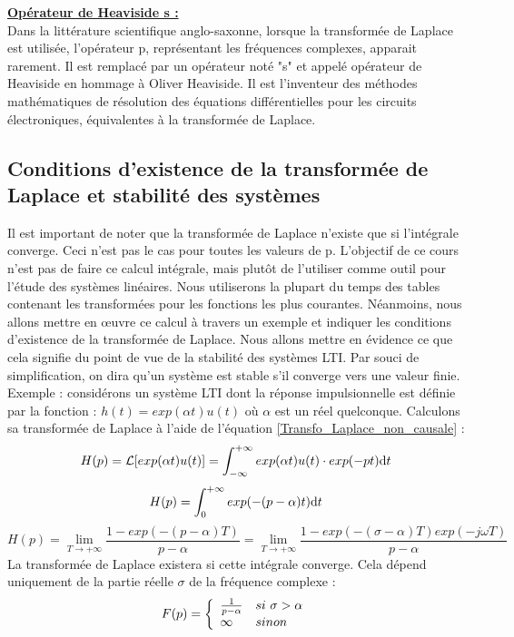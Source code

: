 	\underline{\textbf{Opérateur de Heaviside s :}}\\
	Dans la littérature scientifique anglo-saxonne, lorsque la transformée de Laplace est utilisée, l'opérateur p, représentant les fréquences complexes, apparait rarement. Il est remplacé par un opérateur noté "s" et appelé opérateur de Heaviside en hommage à Oliver Heaviside. Il est l'inventeur des méthodes mathématiques de résolution des équations différentielles pour les circuits électroniques, équivalentes à la transformée de Laplace.\\
	
	

	
	\subsection{Conditions d'existence de la transformée de Laplace et stabilité des systèmes}
	Il est important de noter que la transformée de Laplace n'existe que si l'intégrale converge. Ceci n'est pas le cas pour toutes les valeurs de p.
	L'objectif de ce cours n'est pas de faire ce calcul intégrale, mais plutôt de l'utiliser comme outil pour l'étude des systèmes linéaires. Nous utiliserons la plupart du temps des tables contenant les transformées pour les fonctions les plus courantes. Néanmoins, nous allons mettre en œuvre ce calcul à travers un exemple et indiquer les conditions d'existence de la transformée de Laplace. Nous allons mettre en évidence ce que cela signifie du point de vue de la stabilité des systèmes LTI. Par souci de simplification, on dira qu'un système est stable s'il converge vers une valeur finie.
	Exemple : considérons un système LTI dont la réponse impulsionnelle est définie par la fonction : $h(t) = exp(\alpha t)u(t) $ où $\alpha$ est un réel quelconque.
	Calculons sa transformée de Laplace à l'aide de l'équation \ref{Transfo_Laplace_non_causale} :
	\begin{equation*}
	H(p) = \mathcal{L}[exp(\alpha t)u(t)] = \int_{-\infty}^{+\infty}exp(\alpha t)u(t) \cdot exp(-pt) \mathrm{d} t
	\end{equation*}
	\begin{equation*}
	H(p) = \int_{0}^{+\infty}exp(-(p-\alpha) t) \mathrm{d} t
	\end{equation*}
	\begin{equation*}
	H(p) = \lim_{T \to +\infty} \frac{1-exp(-(p-\alpha)T)}{p-\alpha} = \lim_{T \to +\infty} \frac{1-exp(-(\sigma-\alpha)T)exp(-j\omega T)}{p-\alpha}
	\end{equation*}
	La transformée de Laplace existera si cette intégrale converge. Cela dépend uniquement de la partie réelle $\sigma$ de la fréquence complexe :
	\begin{equation}\label{}
	F(p) = \left \{
	\begin{array}{l l}
	\frac{1}{p-\alpha}  & si~\sigma>\alpha \\
	\infty   & sinon \\
	\end{array}
	\right .	 	
	\end{equation}
	
